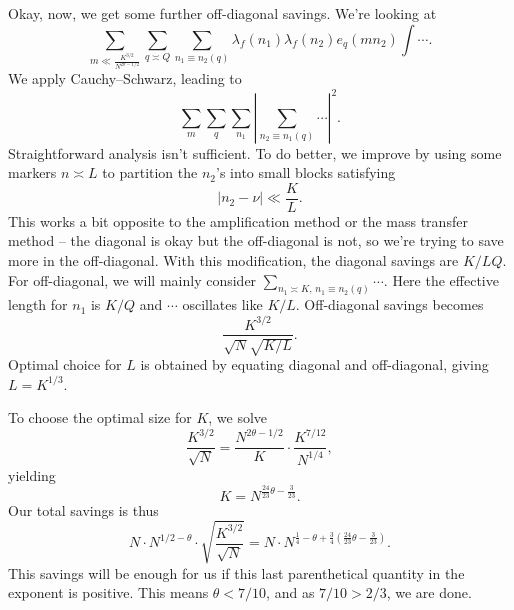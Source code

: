 \documentclass[reqno]{amsart} 
\begin{document}
Okay, now, we get some further off-diagonal savings.  We're looking at
\begin{equation*}
  \sum_{m \ll \frac{K^{3/2}}{N^{2 \theta - 1/2}}}
  \sum_{q \asymp Q} \sum_{n_1 \equiv n_2(q)} \lambda_f(n_1) \lambda_f(n_2) e_q(m n_2) \int \dotsb.
\end{equation*}
We apply Cauchy--Schwarz, leading to
\begin{equation*}
  \sum_{m} \sum_q \sum_{n_1} \left|  \sum_{n_2 \equiv n_1 (q)} \dotsb  \right|^2.
\end{equation*}
Straightforward analysis isn't sufficient.  To do better, we improve by using some markers $n \asymp L$ to partition the $n_2$'s into small blocks satisfying
\begin{equation*}
  \left| n_2 - \nu \right| \ll \frac{K}{L}.
\end{equation*}
This works a bit opposite to the amplification method or the mass transfer method -- the diagonal is okay but the off-diagonal is not, so we're trying to save more in the off-diagonal.  With this modification, the diagonal savings are $K/L Q$.  For off-diagonal, we will mainly consider $\sum_{n_1 \asymp K, \, n_1 \equiv n_2(q) } \dotsb$.  Here the effective length for $n_1$ is $K/Q$ and $\dotsb$ oscillates like $K /L$.  Off-diagonal savings becomes
\begin{equation*}
  \frac{K^{3/2}}{ \sqrt{N} \sqrt{K /L}}.
\end{equation*}
Optimal choice for $L$ is obtained by equating diagonal and off-diagonal, giving $L = K^{1/3}$.

To choose the optimal size for $K$, we solve
\begin{equation*}
  \frac{K^{3/2}}{\sqrt{N}} = \frac{N^{2 \theta - 1/2}}{K} \cdot \frac{K^{7/12}}{N^{1/4}},
\end{equation*}
yielding
\begin{equation*}
  K = N^{\frac{24}{23} \theta - \frac{3}{23}}.
\end{equation*}
Our total savings is thus
\begin{equation*}
  N \cdot N^{1/2 - \theta}
  \cdot \sqrt{\frac{K^{3/2}}{\sqrt{N}}} = N \cdot N^{\frac{1}{4} - \theta + \frac{3}{4} \left( \frac{24}{23} \theta - \frac{3}{23} \right)}.
\end{equation*}
This savings will be enough for us if this last parenthetical quantity in the exponent is positive.  This means $\theta < 7/10$, and as $7/10 > 2/3$, we are done.



{} 
\end{document}
